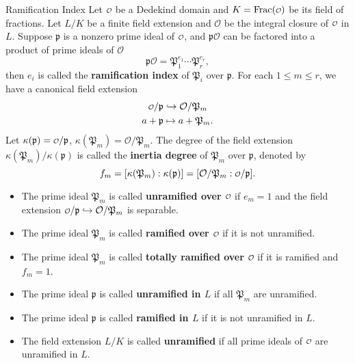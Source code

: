 \begin{definition}{Ramification Index}{}
    Let $\mathcalo$ be a Dedekind domain and $K=\mathrm{Frac}(\mathcalo)$ be its field of fractions. Let $L/K$ be a finite field extension and $\mathcal{O}$ be the integral closure of $\mathcalo$ in $L$. Suppose $\mathfrak{p}$ is a nonzero prime ideal of $\mathcalo$, and $\mathfrak{p}\mathcal{O}$ can be factored into a product of prime ideals of $\mathcal{O}$ 
    \[
    \mathfrak{p}\mathcal{O}=\mathfrak{P}_1^{e_1}\cdots\mathfrak{P}_r^{e_r},
    \]
    then $e_i$ is called the \textbf{ramification index} of $\mathfrak{P}_i$ over $\mathfrak{p}$. For each $1\le m\le r$, 
    we have a canonical field extension 
    \begin{align*}
        \mathcalo/\mathfrak{p}&\hookrightarrow \mathcal{O}/\mathfrak{P}_m\\
        a+\mathfrak{p}&\mapsto a+\mathfrak{P}_m.
    \end{align*}
    Let $\kappa(\mathfrak{p})=\mathcalo/\mathfrak{p}$, $\kappa(\mathfrak{P}_m)=\mathcal{O}/\mathfrak{P}_m$. The degree of the field extension $\kappa(\mathfrak{P}_m)/\kappa(\mathfrak{p})$ is called the \textbf{inertia degree} of $\mathfrak{P}_m$ over $\mathfrak{p}$, denoted by 
    \[
    f_m=[\kappa(\mathfrak{P}_m):\kappa(\mathfrak{p})]=[\mathcal{O}/\mathfrak{P}_m:\mathcalo/\mathfrak{p}].
    \]
    \begin{itemize}
        \item The prime ideal $\mathfrak{P}_m$ is called \textbf{unramified over $\mathcalo$} if $e_m=1$ and the field extension $\mathcalo/\mathfrak{p}\hookrightarrow \mathcal{O}/\mathfrak{P}_m$ is separable.
        \item The prime ideal $\mathfrak{P}_m$ is called \textbf{ramified over $\mathcalo$} if it is not unramified.
        \item The prime ideal $\mathfrak{P}_m$ is called \textbf{totally ramified over $\mathcalo$} if it is ramified and $f_m=1$.
        \item The prime ideal $\mathfrak{p}$ is called \textbf{unramified in $L$} if all $\mathfrak{P}_m$ are unramified.
        \item The prime ideal $\mathfrak{p}$ is called \textbf{ramified in $L$} if it is not unramified in $L$.
        \item The field extension $L/K$ is called \textbf{unramified} if all prime ideals of $\mathcalo$ are unramified in $L$.
    \end{itemize}
\end{definition}
